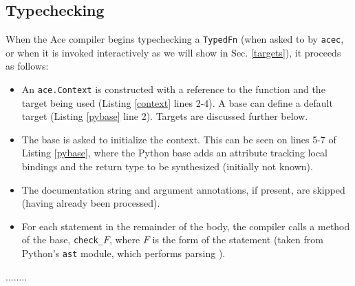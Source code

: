 \documentclass[10pt,preprint]{sigplanconf}
\begin{document}
{\subsection{Typechecking}
When the Ace compiler begins typechecking a \verb|TypedFn| (when asked to by \verb|acec|, or when it is  invoked interactively as we will show in Sec. \ref{targets}), it proceeds as follows:
\begin{itemize}
\item An \verb|ace.Context| is constructed with a reference to the function and the target being used  (Listing \ref{context} lines 2-4). A base can define a default target (Listing \ref{pybase} line 2). Targets are discussed further below. 
\item The base is asked to initialize the context. This can be seen on lines 5-7 of Listing \ref{pybase}, where the Python base adds an attribute tracking local bindings and the return type to be synthesized (initially not known).
\item The documentation string and argument annotations, if present, are skipped (having already been processed).
\item For each statement in the remainder of the body, the compiler calls a method of the base, \verb|check_|$F$, where $F$ is the form of the statement (taken from Python's \verb|ast| module, which performs parsing  \cite{python}). 
\end{itemize}
........
 
}
\end{document}
